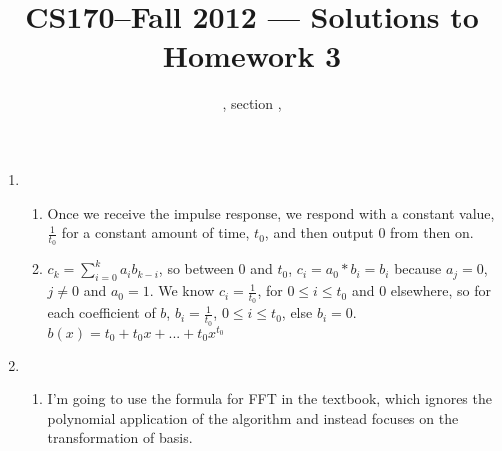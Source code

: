 \documentclass[11pt]{article}
\title{CS170--Fall 2012 --- Solutions to Homework 3}
\author{\Name, section \Sec, \texttt{\Login}}
\begin{document}
\maketitle

\begin{enumerate}
\item
\begin{enumerate}
\item Once we receive the impulse response, we respond with a constant value, $\frac{1}{t_0}$ for a constant amount of time, $t_0$, and then output 0 from then on.
\item $c_k = \sum_{i=0}^k a_i b_{k-i}$, so between $0$ and $t_0$, $c_i=a_0*b_i=b_i$ because $a_j = 0$, $j \neq 0$ and $a_0=1$. We know $c_i=\frac{1}{t_0}$, for $0 \le i \le t_0$ and $0$ elsewhere, so for each coefficient of $b$, $b_i=\frac{1}{t_0}$, $0 \le i \le t_0$, else $b_i=0$. $b(x)=t_0+t_0x+...+t_0x^{t_0}$
\end{enumerate}
\newpage
\item
\begin{enumerate}
\item I'm going to use the formula for FFT in the textbook, which ignores the polynomial application of the algorithm and instead focuses on the transformation of basis.


\end{enumerate}
\end{enumerate}
\end{document}
